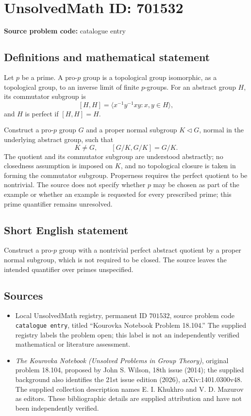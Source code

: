 \documentclass[11pt]{article}
\begin{document}
\section*{UnsolvedMath ID: 701532}
\textbf{Source problem code:} catalogue entry
\subsection{Definitions and mathematical statement}
Let \(p\) be a prime. A pro-\(p\) group is a topological group isomorphic, as a topological group, to an inverse limit of finite \(p\)-groups. For an abstract group \(H\), its commutator subgroup is
\[
[H,H]=\langle x^{-1}y^{-1}xy : x,y\in H\rangle,
\]
and \(H\) is perfect if \([H,H]=H\).

Construct a pro-\(p\) group \(G\) and a proper normal subgroup \(K\lhd G\), normal in the underlying abstract group, such that
\[
K\ne G,\qquad [G/K,G/K]=G/K.
\]
The quotient and its commutator subgroup are understood abstractly; no closedness assumption is imposed on \(K\), and no topological closure is taken in forming the commutator subgroup. Properness requires the perfect quotient to be nontrivial. The source does not specify whether \(p\) may be chosen as part of the example or whether an example is requested for every prescribed prime; this prime quantifier remains unresolved.
\subsection{Short English statement}
Construct a pro-\(p\) group with a nontrivial perfect abstract quotient by a proper normal subgroup, which is not required to be closed. The source leaves the intended quantifier over primes unspecified.
\subsection{Sources}
\begin{itemize}
\item Local UnsolvedMath registry, permanent ID \(701532\), source problem code \texttt{catalogue entry}, titled ``Kourovka Notebook Problem 18.104.'' The supplied registry labels the problem open; this label is not an independently verified mathematical or literature assessment.
\item \emph{The Kourovka Notebook (Unsolved Problems in Group Theory)}, original problem 18.104, proposed by John S. Wilson, 18th issue (2014); the supplied background also identifies the 21st issue edition (2026), arXiv:1401.0300v48. The supplied collection description names E. I. Khukhro and V. D. Mazurov as editors. These bibliographic details are supplied attribution and have not been independently verified.
\end{itemize}
\end{document}
